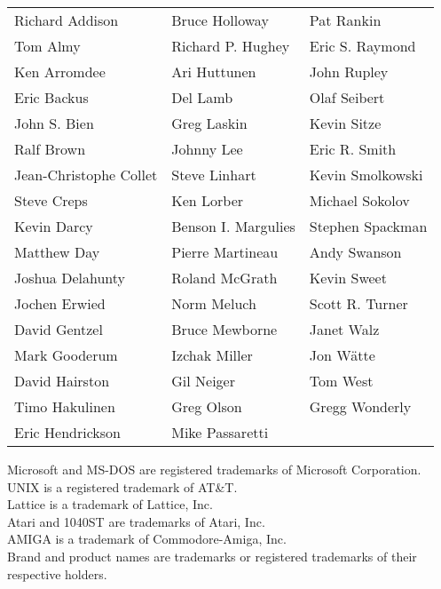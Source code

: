 \begin{center}
\begin{tabular}{lll}
Richard Addison         & Bruce Holloway        & Pat Rankin      \\
Tom Almy                & Richard P. Hughey     & Eric S. Raymond \\
Ken Arromdee            & Ari Huttunen          & John Rupley     \\
Eric Backus             & Del Lamb              & Olaf Seibert    \\
John S. Bien            & Greg Laskin           & Kevin Sitze     \\
Ralf Brown              & Johnny Lee            & Eric R. Smith   \\
Jean-Christophe Collet  & Steve Linhart         & Kevin Smolkowski\\
Steve Creps             & Ken Lorber            & Michael Sokolov \\
Kevin Darcy             & Benson I. Margulies   & Stephen Spackman\\
Matthew Day             & Pierre Martineau      & Andy Swanson    \\
Joshua Delahunty        & Roland McGrath        & Kevin Sweet     \\
Jochen Erwied           & Norm Meluch           & Scott R. Turner \\
David Gentzel           & Bruce Mewborne        & Janet Walz      \\
Mark Gooderum           & Izchak Miller         & Jon W\"atte     \\
David Hairston          & Gil Neiger            & Tom West        \\
Timo Hakulinen          & Greg Olson            & Gregg Wonderly  \\
Eric Hendrickson        & Mike Passaretti       &
\end{tabular}
\end{center}

\vfill
\begin{flushleft}
\small
Microsoft and MS-DOS are registered trademarks of Microsoft Corporation.\\
UNIX is a registered trademark of AT\&T.\\
Lattice is a trademark of Lattice, Inc.\\
Atari and 1040ST are trademarks of Atari, Inc.\\
AMIGA is a trademark of Commodore-Amiga, Inc.\\
Brand and product names are trademarks or registered trademarks
of their respective holders.
\end{flushleft}

